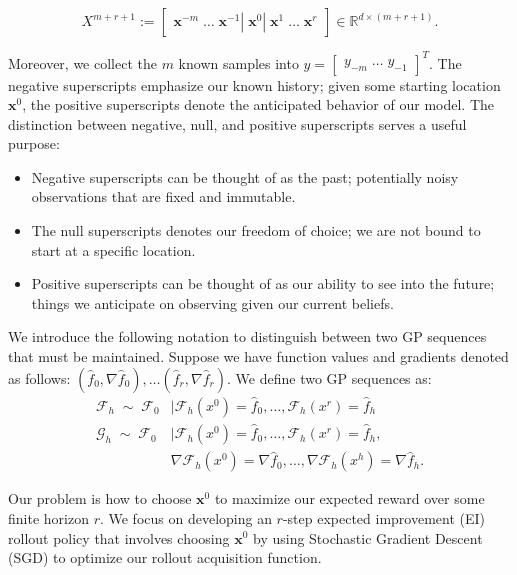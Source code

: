 \documentclass{article}
\begin{document}
$$
X^{m+r+1} :=\begin{bmatrix} \textbf{x}^{-m} \;\dots \;\textbf{x}^{-1} | \;\textbf{x}^0 | \; \textbf{x}^1 
\;\dots\; \textbf{x}^r\end{bmatrix} \in \mathbb{R}^{d\times (m+r+1)}.
$$

Moreover, we collect the $m$ known samples into $y=\begin{bmatrix}y_{-m}\; \dots 
\;y_{-1}\end{bmatrix}^T$. The negative superscripts emphasize our known history; given some starting
location $\textbf{x}^0$, the positive superscripts denote the anticipated behavior of our model.
The distinction between negative, null, and positive superscripts serves a useful purpose:

\begin{itemize}
    \item Negative superscripts can be thought of as the past; potentially noisy observations that are 
    fixed and immutable.
    \item The null superscripts denotes our freedom of choice; we are not bound to start at a specific 
    location.
    \item Positive superscripts can be thought of as our ability to see into the future; things we 
    anticipate on observing given our current beliefs.
\end{itemize}

We introduce the following notation to distinguish between two GP sequences that must be maintained. Suppose
we have function values and gradients denoted as follows: $(\hat{f}_0, \nabla\hat{f}_0), \dots
(\hat{f}_r, \nabla\hat{f}_r)$. We define two GP sequences as:
\begin{align*}
    \mathcal{F}_h \; \sim \;\mathcal{F}_0 &|\mathcal{F}_h(x^0)=\hat{f}_0,\dots,\mathcal{F}_h(x^r)=\hat{f}_h \\
    \mathcal{G}_h \; \sim \;\mathcal{F}_0 &|\mathcal{F}_h(x^0)=\hat{f}_0,\dots,\mathcal{F}_h(x^r)=\hat{f}_h, \\
    &\nabla\mathcal{F}_h(x^0)=\nabla\hat{f}_0,\dots,\nabla\mathcal{F}_h(x^h)=\nabla\hat{f}_h.
\end{align*}

Our problem is how to choose $\textbf{x}^0$ to maximize our expected reward over some finite horizon $r$. We focus on developing an $r$-step expected improvement (EI) rollout policy that involves choosing $\textbf{x}^0$ by using Stochastic Gradient Descent (SGD) to optimize our rollout acquisition function.
\end{document}
